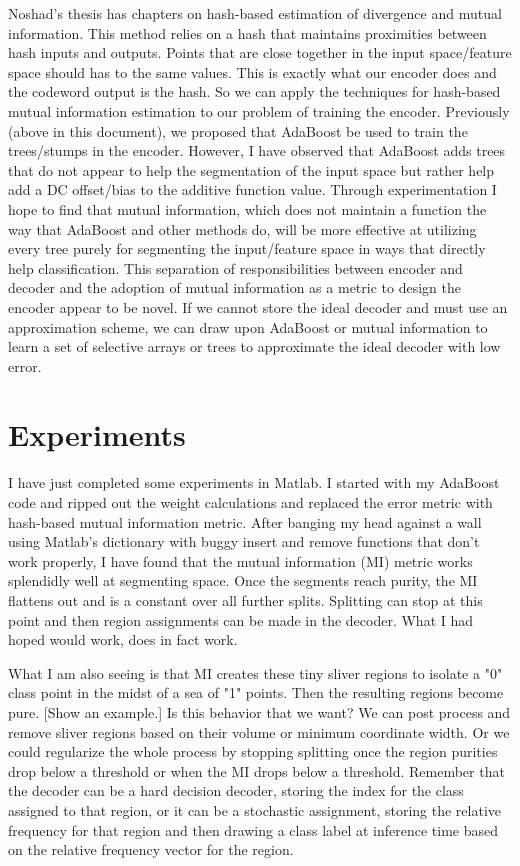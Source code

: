 \documentclass{article}
\begin{document}
Noshad's thesis has chapters on hash-based estimation of divergence and mutual information.  This method relies on a hash that maintains proximities between hash inputs and outputs.  Points that are close together in the input space/feature space should has to the same values.  This is exactly what our encoder does and the codeword output is the hash.  So we can apply the techniques for hash-based mutual information estimation to our problem of training the encoder.  Previously (above in this document), we proposed that AdaBoost be used to train the trees/stumps in the encoder.  However, I have observed that AdaBoost adds trees that do not appear to help the segmentation of the input space but rather help add a DC offset/bias to the additive function value.  Through experimentation I hope to find that mutual information, which does not maintain a function the way that AdaBoost and other methods do, will be more effective at utilizing every tree purely for segmenting the input/feature space in ways that directly help classification.  This separation of responsibilities between encoder and decoder and the adoption of mutual information as a metric to design the encoder appear to be novel.  If we cannot store the ideal decoder and must use an approximation scheme, we can draw upon AdaBoost or mutual information to learn a set of selective arrays or trees to approximate the ideal decoder with low error.

\section{Experiments}

I have just completed some experiments in Matlab.  I started with my AdaBoost code and ripped out the weight calculations and replaced the error metric with hash-based mutual information metric.  After banging my head against a wall using Matlab's dictionary with buggy insert and remove functions that don't work properly, I have found that the mutual information (MI) metric works splendidly well at segmenting space.  Once the segments reach purity, the MI flattens out and is a constant over all further splits.  Splitting can stop at this point and then region assignments can be made in the decoder.  What I had hoped would work, does in fact work.

What I am also seeing is that MI creates these tiny sliver regions to isolate a "0" class point in the midst of a sea of "1" points.  Then the resulting regions become pure.  [Show an example.] Is this behavior that we want?  We can post process and remove sliver regions based on their volume or minimum coordinate width.  Or we could regularize the whole process by stopping splitting once the region purities drop below a threshold or when the MI drops below a threshold.  Remember that the decoder can be a hard decision decoder, storing the index for the class assigned to that region, or it can be a stochastic assignment, storing the relative frequency for that region and then drawing a class label at inference time based on the relative frequency vector for the region.
\end{document}
